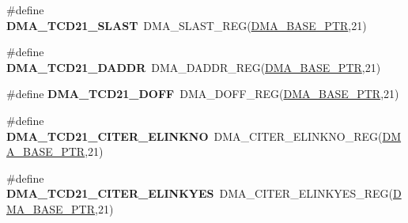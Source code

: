 \begin{DoxyCompactItemize}
\item 
\hypertarget{group___d_m_a___register___accessor___macros_ga485cd29c048b5a4c767e250344cca245}{}\#define {\bfseries D\+M\+A\+\_\+\+T\+C\+D21\+\_\+\+S\+L\+A\+S\+T}~D\+M\+A\+\_\+\+S\+L\+A\+S\+T\+\_\+\+R\+E\+G(\hyperlink{group___d_m_a___peripheral_ga6997fbc1b1973e9f27170217a3bd6f22}{D\+M\+A\+\_\+\+B\+A\+S\+E\+\_\+\+P\+T\+R},21)\label{group___d_m_a___register___accessor___macros_ga485cd29c048b5a4c767e250344cca245}

\item 
\hypertarget{group___d_m_a___register___accessor___macros_ga05cdf25e84f8b375bd268ca863ed9627}{}\#define {\bfseries D\+M\+A\+\_\+\+T\+C\+D21\+\_\+\+D\+A\+D\+D\+R}~D\+M\+A\+\_\+\+D\+A\+D\+D\+R\+\_\+\+R\+E\+G(\hyperlink{group___d_m_a___peripheral_ga6997fbc1b1973e9f27170217a3bd6f22}{D\+M\+A\+\_\+\+B\+A\+S\+E\+\_\+\+P\+T\+R},21)\label{group___d_m_a___register___accessor___macros_ga05cdf25e84f8b375bd268ca863ed9627}

\item 
\hypertarget{group___d_m_a___register___accessor___macros_gab994abdecc011222a59c08748fadfe77}{}\#define {\bfseries D\+M\+A\+\_\+\+T\+C\+D21\+\_\+\+D\+O\+F\+F}~D\+M\+A\+\_\+\+D\+O\+F\+F\+\_\+\+R\+E\+G(\hyperlink{group___d_m_a___peripheral_ga6997fbc1b1973e9f27170217a3bd6f22}{D\+M\+A\+\_\+\+B\+A\+S\+E\+\_\+\+P\+T\+R},21)\label{group___d_m_a___register___accessor___macros_gab994abdecc011222a59c08748fadfe77}

\item 
\hypertarget{group___d_m_a___register___accessor___macros_ga92f764a95a5e749232d9fad6ba175ee5}{}\#define {\bfseries D\+M\+A\+\_\+\+T\+C\+D21\+\_\+\+C\+I\+T\+E\+R\+\_\+\+E\+L\+I\+N\+K\+N\+O}~D\+M\+A\+\_\+\+C\+I\+T\+E\+R\+\_\+\+E\+L\+I\+N\+K\+N\+O\+\_\+\+R\+E\+G(\hyperlink{group___d_m_a___peripheral_ga6997fbc1b1973e9f27170217a3bd6f22}{D\+M\+A\+\_\+\+B\+A\+S\+E\+\_\+\+P\+T\+R},21)\label{group___d_m_a___register___accessor___macros_ga92f764a95a5e749232d9fad6ba175ee5}

\item 
\hypertarget{group___d_m_a___register___accessor___macros_gafd6bc0286d1eb6ce0ff1057e25920d80}{}\#define {\bfseries D\+M\+A\+\_\+\+T\+C\+D21\+\_\+\+C\+I\+T\+E\+R\+\_\+\+E\+L\+I\+N\+K\+Y\+E\+S}~D\+M\+A\+\_\+\+C\+I\+T\+E\+R\+\_\+\+E\+L\+I\+N\+K\+Y\+E\+S\+\_\+\+R\+E\+G(\hyperlink{group___d_m_a___peripheral_ga6997fbc1b1973e9f27170217a3bd6f22}{D\+M\+A\+\_\+\+B\+A\+S\+E\+\_\+\+P\+T\+R},21)\label{group___d_m_a___register___accessor___macros_gafd6bc0286d1eb6ce0ff1057e25920d80}


\end{DoxyCompactItemize}
